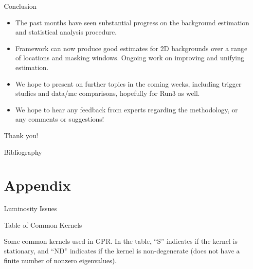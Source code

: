 \documentclass[10pt]{beamer}
\begin{document}
\begin{frame}{Conclusion}
  \begin{itemize}
  \item The past months have seen substantial progress on the background estimation and statistical analysis procedure.
  \item Framework can now produce good estimates for 2D backgrounds over a range of locations and masking windows. Ongoing work on improving and unifying estimation. 
  \item We hope to present on further topics in the coming weeks, including trigger studies and data/mc comparisons, hopefully for Run3 as well. 
  \item We hope to hear any feedback from experts regarding the methodology, or any comments or suggestions!
  \end{itemize}
  \vspace{1cm}

  \begin{center}
    {\Large Thank you!}
  \end{center}
\end{frame}


\begin{frame}[allowframebreaks]{Bibliography}
  
  
\end{frame}


\appendix

\section{Appendix}
\label{sec:appendix}


\begin{frame}{Luminosity Issues}
  \relax
\end{frame}

\begin{frame}{Table of Common Kernels}
  \begin{center}
  \end{center}
  \begin{center}
    Some common kernels used in GPR. In the table, ``S'' indicates if the kernel is stationary, and ``ND'' indicates if the kernel is non-degenerate (does not have a finite number of nonzero eigenvalues).
  \end{center}
\end{frame}
\end{document}

